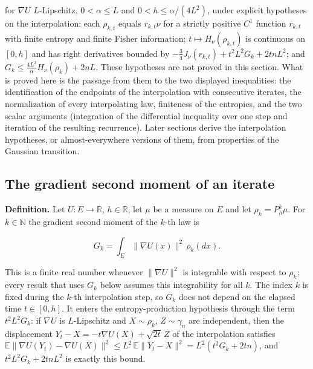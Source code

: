 \documentclass[11pt,a4paper]{report}
\begin{document}
for \(\nabla U\) \(L\)-Lipschitz, \(0<\alpha\le L\) and \(0<h\le\alpha/(4L^2)\), under explicit hypotheses on the interpolation: each \(\rho_{k,t}\) equals \(r_{k,t}\nu\) for a strictly positive \(C^1\) function \(r_{k,t}\) with finite entropy and finite Fisher information; \(t\mapsto H_\nu(\rho_{k,t})\) is continuous on \([0,h]\) and has right derivatives bounded by \(-\frac34J_\nu(r_{k,t})+t^2L^2G_k+2tnL^2\); and \(G_k\le\frac{4L^2}{\alpha}H_\nu(\rho_k)+2nL\). These hypotheses are not proved in this section. What is proved here is the passage from them to the two displayed inequalities: the identification of the endpoints of the interpolation with consecutive iterates, the normalization of every interpolating law, finiteness of the entropies, and the two scalar arguments (integration of the differential inequality over one step and iteration of the resulting recurrence). Later sections derive the interpolation hypotheses, or almost-everywhere versions of them, from properties of the Gaussian transition.

\subsection{\texorpdfstring{The gradient second moment of an iterate}{The gradient second moment of an iterate}}
\label{report-step-UnadjustedLangevin-LSI-Theorem-lean-1}


\textbf{Definition.} Let \(U:E\to\mathbb R\), \(h\in\mathbb R\), let \(\mu\) be a measure on \(E\) and let \(\rho_k=P_h^k\mu\). For \(k\in\mathbb N\) the gradient second moment of the \(k\)-th law is


\[G_k=\int_E\|\nabla U(x)\|^2\,\rho_k(dx).\]


This is a finite real number whenever \(\|\nabla U\|^2\) is integrable with respect to \(\rho_k\); every result that uses \(G_k\) below assumes this integrability for all \(k\). The index \(k\) is fixed during the \(k\)-th interpolation step, so \(G_k\) does not depend on the elapsed time \(t\in[0,h]\). It enters the entropy-production hypothesis through the term \(t^2L^2G_k\): if \(\nabla U\) is \(L\)-Lipschitz and \(X\sim\rho_k\), \(Z\sim\gamma_n\) are independent, then the displacement \(Y_t-X=-t\nabla U(X)+\sqrt{2t}\,Z\) of the interpolation satisfies \(\mathbb E\|\nabla U(Y_t)-\nabla U(X)\|^2\le L^2\,\mathbb E\|Y_t-X\|^2=L^2(t^2G_k+2tn)\), and \(t^2L^2G_k+2tnL^2\) is exactly this bound.
\end{document}

